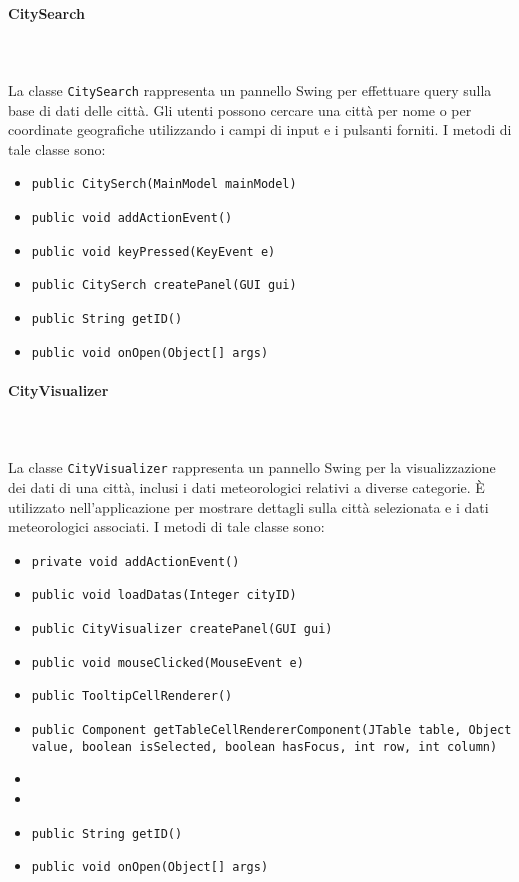 \paragraph{CitySearch}\\
\\
La classe \texttt{CitySearch} rappresenta un pannello Swing per effettuare query sulla base di dati delle città.
Gli utenti possono cercare una città per nome o per coordinate geografiche utilizzando i campi di input e i pulsanti forniti.
I metodi di tale classe sono:
\begin{itemize}
    \item \texttt{public CitySerch(MainModel mainModel)}
    \item \texttt{public void addActionEvent()}
    \item \texttt{public void keyPressed(KeyEvent e)}
    \item \texttt{public CitySerch createPanel(GUI gui)}
    \item \texttt{public String getID()}
    \item \texttt{public void onOpen(Object[] args)}
\end{itemize}

\paragraph{CityVisualizer}\\
\\
La classe \texttt{CityVisualizer} rappresenta un pannello Swing per la visualizzazione dei dati di una città, inclusi i dati meteorologici relativi a diverse categorie.
È utilizzato nell'applicazione per mostrare dettagli sulla città selezionata e i dati meteorologici associati.
I metodi di tale classe sono:
\begin{itemize}
    \item \texttt{private void addActionEvent()}
    \item \texttt{public void loadDatas(Integer cityID)}
    \item \texttt{public CityVisualizer createPanel(GUI gui)}
    \item \texttt{public void mouseClicked(MouseEvent e)}
    \item \texttt{public TooltipCellRenderer()}
    \item \texttt{public Component getTableCellRendererComponent(JTable table, Object value, boolean isSelected, boolean hasFocus, int row, int column)}
    \item  {}
    \item {}
    \item \texttt{public String getID()}
    \item \texttt{public void onOpen(Object[] args)}
\end{itemize}

